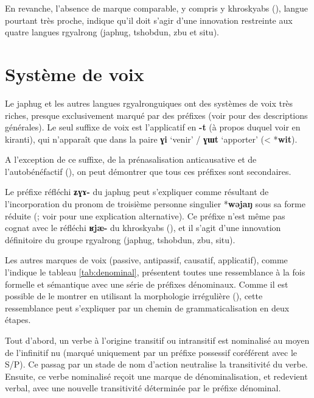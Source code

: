 \documentclass[oldfontcommands,oneside,a4paper,11pt]{article}
\newcommand{\ipa}[1]{{\phon\textbf{\mbox{#1}}}} %
\begin{document}
En revanche, l'absence de marque comparable, y compris y khroskyabs (\citealt{lai13affixale}), langue pourtant très proche, indique qu'il doit s'agir d'une innovation restreinte aux quatre langues rgyalrong (japhug, tshobdun, zbu et situ).

\section{Système de voix}

Le japhug et les autres langues rgyalronguiques ont des systèmes de voix très riches, presque exclusivement marqué par des préfixes (voir  \citealt{lai13affixale, jacques14antipassive, jackson14morpho} pour des descriptions générales). Le seul suffixe de voix est l'applicatif en \ipa{-t} (à propos duquel voir \citealt{michailovsky85dental, jacques15derivational.khaling} en kiranti), qui n'apparaît que dans la paire \ipa{ɣi} `venir' /  \ipa{ɣɯt} `apporter' (< *\ipa{wit}).

A l'exception de ce suffixe, de la prénasalisation anticausative et de l'autobénéfactif (\citealt{jacques12demotion, jacques15spontaneous}), on peut démontrer que tous ces préfixes sont secondaires.

Le préfixe réfléchi \ipa{ʑɣɤ-} du japhug peut s'expliquer comme résultant de l'incorporation du pronom de troisième personne singulier *\ipa{wəjaŋ} sous sa forme réduite (\citealt{jacques10refl}; voir  \citealt{jackson14morpho} pour une explication alternative). Ce préfixe n'est même pas cognat avec le réfléchi \ipa{ʁjæ-} du khroskyabs  (\citealt[156-7]{lai13affixale}), et il s'agit d'une innovation définitoire du groupe rgyalrong (japhug, tshobdun, zbu, situ).

Les autres marques de voix (passive, antipassif, causatif, applicatif), comme l'indique le tableau  \ref{tab:denominal}, présentent toutes une ressemblance à la fois formelle et sémantique avec une série de préfixes dénominaux. Comme il est possible de le montrer en utilisant la morphologie irrégulière (\citealt{jacques14antipassive}), cette ressemblance peut s'expliquer par un chemin de grammaticalisation en deux étapes. 

Tout d'abord, un verbe à l'origine transitif ou intransitif est nominalisé au moyen de l'infinitif nu (marqué uniquement par un préfixe possessif coréférent avec le S/P). Ce passag par un stade de nom d'action neutralise la transitivité du verbe. Ensuite, ce verbe nominalisé reçoit une marque de dénominalisation, et redevient verbal, avec une nouvelle transitivité déterminée par le préfixe dénominal. 
\end{document}
